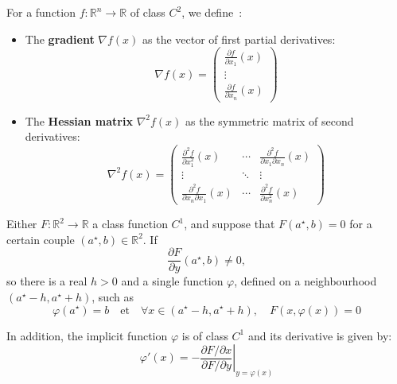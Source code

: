 \begin{f}
	For a function \( f: \mathbb{R}^n \rightarrow \mathbb{R} \) of class \( C^2 \), we define :
	
	\begin{itemize}
		\item The \textbf{gradient} \( \nabla f(x) \) as the vector of first partial derivatives:
		\[
		\nabla f(x) = 
		\begin{pmatrix}
			\frac{\partial f}{\partial x_1}(x) \\
			\vdots \\
			\frac{\partial f}{\partial x_n}(x)
		\end{pmatrix}
		\]
		
		\item The \textbf{Hessian matrix} \( \nabla^2 f(x) \) as the symmetric matrix of second derivatives:
		\[
		\nabla^2 f(x) =
		\begin{pmatrix}
			\frac{\partial^2 f}{\partial x_1^2}(x) & \cdots & \frac{\partial^2 f}{\partial x_1 \partial x_n}(x) \\
			\vdots & \ddots & \vdots \\
			\frac{\partial^2 f}{\partial x_n \partial x_1}(x) & \cdots & \frac{\partial^2 f}{\partial x_n^2}(x)
		\end{pmatrix}
		\]
	\end{itemize}
	
\end{f}

\begin{f}
	Either \( F: \mathbb{R}^2 \rightarrow \mathbb{R} \) a class function \( C^1 \), and suppose that \( F(a^\star, b) = 0 \) for a certain couple \( (a^\star, b) \in \mathbb{R}^2 \). If
	\[
	\frac{\partial F}{\partial y}(a^\star, b) \neq 0,
	\]
	so there is a real \( h > 0 \) and a single function \( \varphi \), defined on a neighbourhood \( (a^\star - h, a^\star + h) \), such as
	\[
	\varphi(a^\star) = b \quad \text{et} \quad \forall x \in (a^\star - h, a^\star + h), \quad F(x, \varphi(x)) = 0
	\]
	
	In addition, the implicit function \( \varphi \) is of class \( C^1 \) and its derivative is given by:
	\[
	\varphi'(x) = - \left. \frac{\partial F / \partial x}{\partial F / \partial y} \right|_{y = \varphi(x)}
	\]
	

\end{f}
